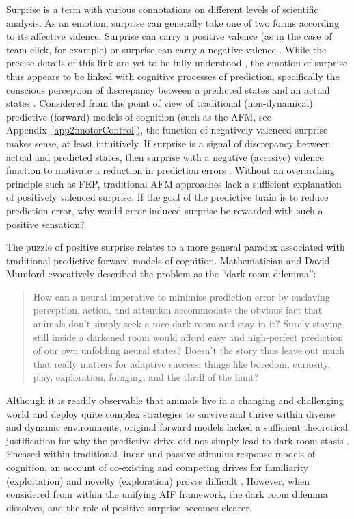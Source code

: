 \begin{CJK}{UTF8}{gbsn}
Surprise is a term with various connotations on different levels of scientific analysis.  As an emotion, surprise can generally take one of two forms according to its affective valence.  Surprise can carry a positive valence (as in the case of team click, for example) or surprise can carry a negative valence \citep[in the case of shock or fright][]{Chetverikov2014}.  While the precise details of this link are yet to be fully understood \citep{Schwartenbeck2013}, the emotion of surprise thus appears to be linked with cognitive processes of prediction, specifically the conscious perception of discrepancy between a predicted states and an actual states \citep{Foster2015}.
Considered from the point of view of traditional (non-dynamical) predictive (forward) models of cognition (such as the AFM, see Appendix~\ref{app2:motorControl}), the function of negatively valenced surprise makes sense, at least intuitively.  If surprise is a signal of discrepancy between actual and predicted states, then surprise with a negative (aversive) valence function to motivate a reduction in prediction errors \citep{Egner2011}.  Without an overarching principle such as FEP, traditional AFM approaches lack a sufficient explanation of positively valenced surprise. If the goal of the predictive brain is to reduce prediction error, why would error-induced surprise be rewarded with such a positive sensation?

The puzzle of positive surprise relates to a more general paradox associated with traditional predictive forward models of cognition.  Mathematician and David Mumford evocatively described the problem as the ``dark room dilemma'':

      \begin{quote}
        How can a neural imperative to minimise prediction error by enslaving perception, action, and attention accommodate the obvious fact that animals don’t simply seek a nice dark room and stay in it? Surely staying still inside a darkened room would afford easy and nigh-perfect prediction of our own unfolding neural states? Doesn’t the story thus leave out much that really matters for adaptive success: things like boredom, curiosity, play, exploration, foraging, and the thrill of the hunt? \citep[243]{Mumford1992}
      \end{quote}

Although it is readily observable that animals live in a changing and challenging world and deploy quite complex strategies to survive and thrive within diverse and dynamic environments, original forward models lacked a sufficient theoretical justification for why the predictive drive did not simply lead to dark room stasis \citep{Clark2013}.  Encased within traditional linear and passive stimulus-response models of cognition, an account of co-existing and competing drives for familiarity (exploitation) and novelty (exploration) proves difficult \citep{Kelso2009}.  However, when considered from within the unifying AIF framework, the dark room dilemma dissolves, and the role of positive surprise becomes clearer.


\end{CJK}

